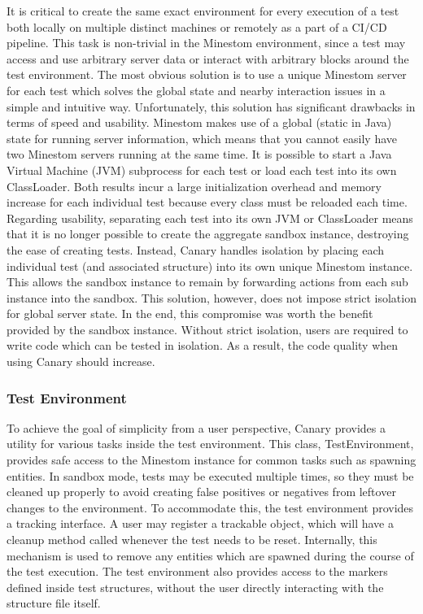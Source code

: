\documentclass{article}
\begin{document}
\begin{onehalfspacing}
It is critical to create the same exact environment for every execution
of a test both locally on multiple distinct machines or remotely as a
part of a CI/CD pipeline. This task is non-trivial in the Minestom
environment, since a test may access and use arbitrary server data or
interact with arbitrary blocks around the test environment. The most
obvious solution is to use a unique Minestom server for each test which
solves the global state and nearby interaction issues in a simple and
intuitive way. Unfortunately, this solution has significant drawbacks in
terms of speed and usability. Minestom makes use of a global (static in
Java) state for running server information, which means that you cannot
easily have two Minestom servers running at the same time. It is
possible to start a Java Virtual Machine (JVM) subprocess for each test
or load each test into its own ClassLoader. Both results incur a large
initialization overhead and memory increase for each individual test
because every class must be reloaded each time. Regarding usability,
separating each test into its own JVM or ClassLoader means that it is no
longer possible to create the aggregate sandbox instance, destroying the
ease of creating tests. Instead, Canary handles isolation by placing
each individual test (and associated structure) into its own unique
Minestom instance. This allows the sandbox instance to remain by
forwarding actions from each sub instance into the sandbox. This
solution, however, does not impose strict isolation for global server
state. In the end, this compromise was worth the benefit provided by the
sandbox instance. Without strict isolation, users are required to write
code which can be tested in isolation. As a result, the code quality
when using Canary should increase.

\subsubsection{Test Environment}

To achieve the goal of simplicity from a user perspective, Canary
provides a utility for various tasks inside the test environment. This
class, TestEnvironment, provides safe access to the Minestom instance
for common tasks such as spawning entities. In sandbox mode, tests may
be executed multiple times, so they must be cleaned up properly to avoid
creating false positives or negatives from leftover changes to the
environment. To accommodate this, the test environment provides a
tracking interface. A user may register a trackable object, which will
have a cleanup method called whenever the test needs to be reset.
Internally, this mechanism is used to remove any entities which are
spawned during the course of the test execution. The test environment
also provides access to the markers defined inside test structures,
without the user directly interacting with the structure file itself.


\end{onehalfspacing}
\end{document}
